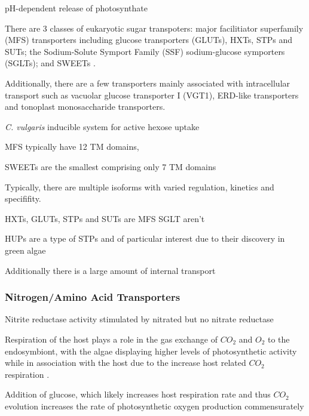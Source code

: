 {{ pH-dependent release of photosynthate \citep{}



There are 3 classes of eukaryotic sugar transpoters: major facilitiator superfamily (MFS) 
transporters including glucose
transporters (GLUTs), HXTs, STPs and SUTs; the Sodium-Solute Symport Family (SSF) sodium-glucose symporters (SGLTs); 
and SWEETs \citep{Chen2010a,Chen2015}.

Additionally, there are a few transporters mainly associated with intracellular transport such as 
vacuolar glucose transporter I (VGT1), ERD-like transporters and tonoplast monosaccharide transporters.


\textit{C. vulgaris} inducible system for active hexose uptake \citep{Tanner1974}






MFS typically have 12 TM domains, 

SWEETs are the smallest comprising only 7 TM domains \citep{Chen2015}

Typically, there are multiple isoforms with varied regulation, kinetics and specififity.




HXTs, GLUTs, STPs and SUTs are MFS
SGLT aren't



HUPs are a type of STPs \citep{Chen2015} and of particular interest due to their discovery in green
algae \citep{Sauer1989}




Additionally there is a large amount of internal transport 





\subsubsection{Nitrogen/Amino Acid Transporters}

Nitrite reductase activity stimulated by nitrated but no nitrate reductase
\citep{Kamako2005}




 Respiration of the host plays a role in the gas exchange of \(CO_2\) and \(O_2\) 
 to the endosymbiont, with the algae displaying higher levels of photosynthetic
 activity while in association with the host due to the increase host related 
 \(CO_2\) respiration \citep{Reisser1980}.

Addition of glucose, which likely increases host respiration rate and thus \(CO_2\)
evolution increases the rate of photosynthetic oxygen production commensurately \citep{Reisser1980}




}}
